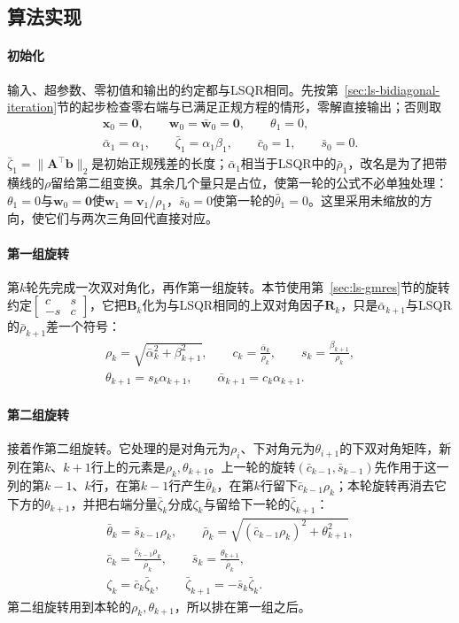 \subsection{算法实现}

\paragraph{初始化}
输入、超参数、零初值和输出的约定都与LSQR相同。先按第~\ref{sec:ls-bidiagonal-iteration}节的起步检查零右端与已满足正规方程的情形，零解直接输出；否则取
\[
 \begin{gathered}
 \bm x_0=\bm0,\qquad \bm w_0=\bar{\bm w}_0=\bm0,\qquad \theta_1=0,\\
 \bar\alpha_1=\alpha_1,\qquad \bar\zeta_1=\alpha_1\beta_1,\qquad \bar c_0=1,\qquad \bar s_0=0 .
 \end{gathered}
\]
$\bar\zeta_1=\lVert\bm A^\top\bm b\rVert_2$是初始正规残差的长度；$\bar\alpha_1$相当于LSQR中的$\bar\rho_1$，改名是为了把带横线的$\rho$留给第二组变换。其余几个量只是占位，使第一轮的公式不必单独处理：$\theta_1=0$与$\bm w_0=\bm0$使$\bm w_1=\bm v_1/\rho_1$，$\bar s_0=0$使第一轮的$\bar\theta_1=0$。这里采用未缩放的方向，使它们与两次三角回代直接对应。

\paragraph{第一组旋转}
第$k$轮先完成一次双对角化，再作第一组旋转。本节使用第~\ref{sec:ls-gmres}节的旋转约定$\left[\begin{smallmatrix}c&s\\-s&c\end{smallmatrix}\right]$，它把$\bm B_k$化为与LSQR相同的上双对角因子$\bm R_k$，只是$\bar\alpha_{k+1}$与LSQR的$\bar\rho_{k+1}$差一个符号：
\[
 \begin{gathered}
 \rho_k=\sqrt{\bar\alpha_k^2+\beta_{k+1}^2},\qquad
 c_k=\frac{\bar\alpha_k}{\rho_k},\qquad s_k=\frac{\beta_{k+1}}{\rho_k},\\
 \theta_{k+1}=s_k\alpha_{k+1},\qquad
 \bar\alpha_{k+1}=c_k\alpha_{k+1}.
 \end{gathered}
\]

\paragraph{第二组旋转}
接着作第二组旋转。它处理的是对角元为$\rho_i$、下对角元为$\theta_{i+1}$的下双对角矩阵，新列在第$k$、$k+1$行上的元素是$\rho_k,\theta_{k+1}$。上一轮的旋转$(\bar c_{k-1},\bar s_{k-1})$先作用于这一列的第$k-1$、$k$行，在第$k-1$行产生$\bar\theta_k$，在第$k$行留下$\bar c_{k-1}\rho_k$；本轮旋转再消去它下方的$\theta_{k+1}$，并把右端分量$\bar\zeta_k$分成$\zeta_k$与留给下一轮的$\bar\zeta_{k+1}$：
\[
 \begin{gathered}
 \bar\theta_k=\bar s_{k-1}\rho_k,\qquad
 \bar\rho_k=\sqrt{(\bar c_{k-1}\rho_k)^2+\theta_{k+1}^2},\\
 \bar c_k=\frac{\bar c_{k-1}\rho_k}{\bar\rho_k},\qquad
 \bar s_k=\frac{\theta_{k+1}}{\bar\rho_k},\\
 \zeta_k=\bar c_k\bar\zeta_k,\qquad
 \bar\zeta_{k+1}=-\bar s_k\bar\zeta_k .
 \end{gathered}
\]
第二组旋转用到本轮的$\rho_k,\theta_{k+1}$，所以排在第一组之后。


